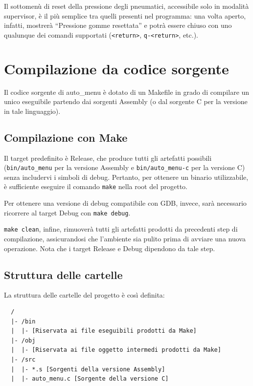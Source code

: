 \documentclass[
  12pt,
  a4paper,
  headings=optiontoheadandtoc
]{scrreprt}
\begin{document}
Il sottomenù di reset della pressione degli pneumatici, accessibile solo in modalità supervisor, è il più semplice tra quelli presenti nel programma: una volta aperto, infatti, mostrerà ``Pressione gomme resettata'' e potrà essere chiuso con uno qualunque dei comandi supportati (\texttt{<return>}, \texttt{q-<return>}, etc.).

\chapter[nonumber=true]{Compilazione da codice sorgente}

Il codice sorgente di auto\_menu è dotato di un Makefile in grado di compilare un unico eseguibile partendo dai sorgenti Assembly (o dal sorgente C per la versione in tale linguaggio).

\section[nonumber=true]{Compilazione con Make}

Il target predefinito è Release, che produce tutti gli artefatti possibili (\texttt{bin/auto\_menu} per la versione Assembly e \texttt{bin/auto\_menu-c} per la versione C) senza includervi i simboli di debug. Pertanto, per ottenere un binario utilizzabile, è sufficiente eseguire il comando \texttt{make} nella root del progetto.

Per ottenere una versione di debug compatibile con GDB, invece, sarà necessario ricorrere al target Debug con \texttt{make debug}.

\texttt{make clean}, infine, rimuoverà tutti gli artefatti prodotti da precedenti step di compilazione, assicurandosi che l'ambiente sia pulito prima di avviare una nuova operazione. Nota che i target Release e Debug dipendono da tale step.

\section[nonumber=true]{Struttura delle cartelle}

La struttura delle cartelle del progetto è così definita:

\begin{verbatim}
  /
  |- /bin
  |  |- [Riservata ai file eseguibili prodotti da Make]
  |- /obj
  |  |- [Riservata ai file oggetto intermedi prodotti da Make]
  |- /src
  |  |- *.s [Sorgenti della versione Assembly]
  |  |- auto_menu.c [Sorgente della versione C]
\end{verbatim}
\end{document}
